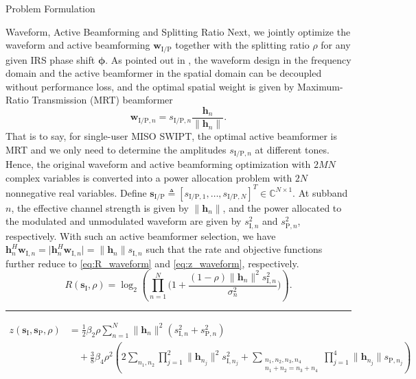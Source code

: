 \documentclass[journal]{IEEEtran}
\begin{document}
\begin{section}{Problem Formulation}
		\begin{subsection}{Waveform, Active Beamforming and Splitting Ratio}
			Next, we jointly optimize the waveform and active beamforming $\boldsymbol{w}_{\mathrm{I/P}}$ together with the splitting ratio $\rho$ for any given IRS phase shift $\boldsymbol{\phi}$. As pointed out in \cite{Clerckx2018b}, the waveform design in the frequency domain and the active beamformer in the spatial domain can be decoupled without performance loss, and the optimal spatial weight is given by Maximum-Ratio Transmission (MRT) beamformer
			\begin{equation}\label{eq:w_IP}
				\boldsymbol{w}_{\mathrm{I/P},n}=s_{\mathrm{I/P},n}\frac{\boldsymbol{h}_n}{\lVert{\boldsymbol{h}_n}\rVert}.
			\end{equation}
			That is to say, for single-user MISO SWIPT, the optimal active beamformer is MRT and we only need to determine the amplitudes $s_{\mathrm{I/P},n}$ at different tones. Hence, the original waveform and active beamforming optimization with $2MN$ complex variables is converted into a power allocation problem with $2N$ nonnegative real variables. Define $\boldsymbol{s}_{\mathrm{I/P}} \triangleq [s_{\mathrm{I/P},1},\dots,s_{\mathrm{I/P},N}]^T \in \mathbb{C}^{N \times 1}$. At subband $n$, the effective channel strength is given by $\lVert{\boldsymbol{h}_n}\rVert$, and the power allocated to the modulated and unmodulated waveform are given by $s_{\mathrm{I},n}^2$ and $s_{\mathrm{P},n}^2$, respectively. With such an active beamformer selection, we have $\boldsymbol{h}_n^H\boldsymbol{w}_{\mathrm{I},n}=\lvert{\boldsymbol{h}_n^H\boldsymbol{w}_{\mathrm{I},n}}\rvert=\lVert{\boldsymbol{h}_n}\rVert s_{\mathrm{I},n}$ such that the rate and objective functions further reduce to \eqref{eq:R_waveform} and \eqref{eq:z_waveform}, respectively.
			\begin{equation}\label{eq:R_waveform}
				R(\boldsymbol{s}_{\mathrm{I}},\rho) = \log_2\left(\prod_{n=1}^N\biggl(1+\frac{(1-\rho)\lVert{\boldsymbol{h}_n}\rVert^2 s_{\mathrm{I},n}^2}{\sigma_n^2}\biggr)\right).
			\end{equation}
			\begin{figure*}[!b]
				\hrule
				\begin{align}
					z(\boldsymbol{s}_{\mathrm{I}},\boldsymbol{s}_\mathrm{P},\rho)
					& = \frac{1}{2}{\beta_2}{\rho} \sum_{n=1}^N \lVert{\boldsymbol{h}_n}\rVert^2(s_{\mathrm{I},n}^2+s_{\mathrm{P},n}^2)\nonumber\\
					& \quad + \frac{3}{8}{\beta_4}{\rho^2} \left( 2\sum_{n_1,n_2} \prod_{j=1}^2 \lVert{\boldsymbol{h}_{n_j}}\rVert^2 s_{\mathrm{I},{n_j}}^2 + \sum_{\substack{{n_1},{n_2},{n_3},{n_4}\\{n_1}+{n_2}={n_3}+{n_4}}} \prod_{j=1}^4 \lVert{\boldsymbol{h}_{n_j}}\rVert s_{\mathrm{P},{n_j}} \right)\nonumber\\

\end{align}
\end{figure*}
\end{subsection}
\end{section}
\end{document}
